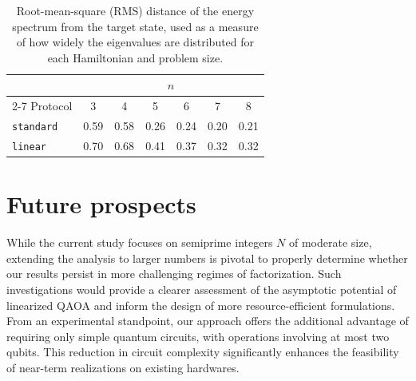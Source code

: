 \begin{table}[h]
    \centering
    \begin{tabular}{@{}lcccccc@{}}
        \toprule
        & \multicolumn{6}{c}{$n$} \\
        \cmidrule(lr){2-7}
        Protocol            & 3     & 4     & 5     & 6     & 7     & 8 \\
        \midrule
        \texttt{standard}   & 0.59  & 0.58  & 0.26  & 0.24  & 0.20  & 0.21 \\
        \texttt{linear}     & 0.70  & 0.68  & 0.41  & 0.37  & 0.32  & 0.32 \\
        \bottomrule
    \end{tabular}
    \caption{Root-mean-square (RMS) distance of the energy spectrum from the target state, used as a measure of how widely the eigenvalues are distributed for each Hamiltonian and problem size.}
    \label{table:rms}
\end{table}

\section{Future prospects}

While the current study focuses on semiprime integers $N$ of moderate size, extending the analysis to larger numbers is pivotal to properly determine whether our results persist in more challenging regimes of factorization. Such investigations would provide a clearer assessment of the asymptotic potential of linearized QAOA and inform the design of more resource-efficient formulations. From an experimental standpoint, our approach offers the additional advantage of requiring only simple quantum circuits, with operations involving at most two qubits. This reduction in circuit complexity significantly enhances the feasibility of near-term realizations on existing hardwares.
